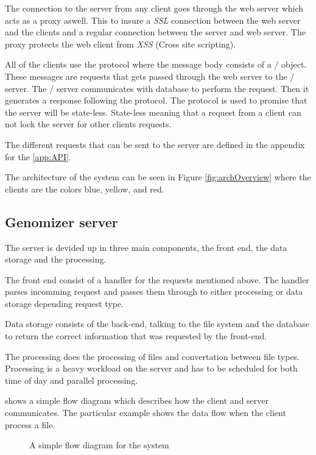 The connection to the server from any client goes through the web server which acts as a proxy aswell. This to insure a \textit{SSL} connection between the web server and the clients and a regular connection between the server and web server. The proxy protects the web client from \textit{XSS} (Cross site scripting). 

All of the clients use the  protocol where the message body consists of a \json/ object.
These messages are requests that gets passed through the web server to the \appName/ server. The \appName/ server communicates with database to perform the request. Then it generates a response following the  protocol. The  protocol is used to promise that the server will be state-less. State-less meaning that a request from a client can not lock the server for other clients requests. 

The different requests that can be sent to the server are defined in the appendix for the  
\ref{app:API}.

The architecture of the system can be seen in Figure \ref{fig:archOverview} where the clients are the colors blue, yellow, and red. 

\subsection{Genomizer server}
The server is devided up in three main components, the front end, the data storage and the processing.

The front end consist of a handler for the  requests mentioned above. The handler parses incomming request and passes them through to either processing or data storage depending request type.

Data storage consists of the back-end, talking to the file system and the database to return the correct information that was requested by the front-end.

The processing does the processing of files and convertation between file types. Processing is a heavy workload on the server and has to be scheduled for both time of day and  parallel processing.

 shows a simple flow diagram which
describes how the client and server communicates. The particular
example shows the data flow when the client process a file.

\begin{figure}[htb]
\caption{A simple flow diagram for the system}
\label{fig:com_systemoverview}
\end{figure}


